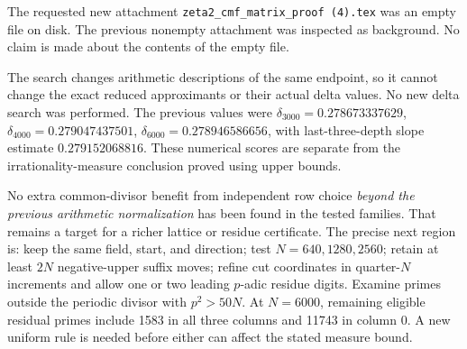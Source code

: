 \documentclass[11pt]{article}
\begin{document}
The requested new attachment
\texttt{zeta2\_cmf\_matrix\_proof (4).tex} was an empty file on disk.
The previous nonempty attachment was inspected as background. No
claim is made about the contents of the empty file.

The search changes arithmetic descriptions of the same endpoint,
so it cannot change the exact reduced approximants or their actual
delta values. No new delta search was performed. The previous values
were $\delta_{3000}=0.278673337629$,
$\delta_{4000}=0.279047437501$,
$\delta_{6000}=0.278946586656$, with last-three-depth slope estimate
$0.279152068816$. These numerical scores are separate from the
irrationality-measure conclusion proved using upper bounds.

No extra common-divisor benefit from independent row choice \emph{beyond
the previous arithmetic normalization} has been found in the tested
families. That remains a target for a richer lattice or residue
certificate. The precise next region is: keep the
same field, start, and direction; test $N=640,1280,2560$; retain at
least $2N$ negative-upper suffix moves; refine cut coordinates in
quarter-$N$ increments and allow one or two leading $p$-adic residue
digits. Examine primes outside the periodic divisor with $p^2>50N$.
At $N=6000$, remaining eligible residual primes include 1583 in all
three columns and 11743 in column 0. A new uniform rule is needed
before either can affect the stated measure bound.
\end{document}
